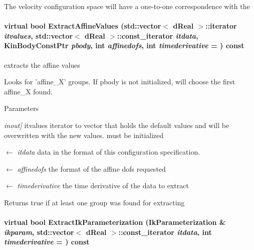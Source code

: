 The velocity configuration space will have a one-\/to-\/one correspondence with the \hypertarget{classOpenRAVE_1_1ConfigurationSpecification_a572098999c73392e7f0020e6729def4c}{
\paragraph[{ExtractAffineValues}]{\setlength{\rightskip}{0pt plus 5cm}virtual bool ExtractAffineValues (std::vector$<$ dReal $>$::iterator {\em itvalues}, \/  std::vector$<$ dReal $>$::const\_\-iterator {\em itdata}, \/  KinBodyConstPtr {\em pbody}, \/  int {\em affinedofs}, \/  int {\em timederivative} = {}) const}\hfill}
\label{classOpenRAVE_1_1ConfigurationSpecification_a572098999c73392e7f0020e6729def4c}


extracts the affine values 

Looks for 'affine\_\-X' groups. If pbody is not initialized, will choose the first affine\_\-X found. 
\begin{DoxyParams}{Parameters}
\item[{\em inout\mbox{]}}]itvalues iterator to vector that holds the default values and will be overwritten with the new values. must be initialized \item[\mbox{$\leftarrow$} {\em itdata}]data in the format of this configuration specification. \item[\mbox{$\leftarrow$} {\em affinedofs}]the format of the affine dofs requested \item[\mbox{$\leftarrow$} {\em timederivative}]the time derivative of the data to extract \end{DoxyParams}
\begin{DoxyReturn}{Returns}
true if at least one group was found for extracting 
\end{DoxyReturn}
\hypertarget{classOpenRAVE_1_1ConfigurationSpecification_aba9ff3f41a4bb1b06bf0691a0141ca78}{
\paragraph[{ExtractIkParameterization}]{\setlength{\rightskip}{0pt plus 5cm}virtual bool ExtractIkParameterization ({\bf IkParameterization} \& {\em ikparam}, \/  std::vector$<$ dReal $>$::const\_\-iterator {\em itdata}, \/  int {\em timederivative} = {}) const}\hfill}
\label{classOpenRAVE_1_1ConfigurationSpecification_aba9ff3f41a4bb1b06bf0691a0141ca78}


